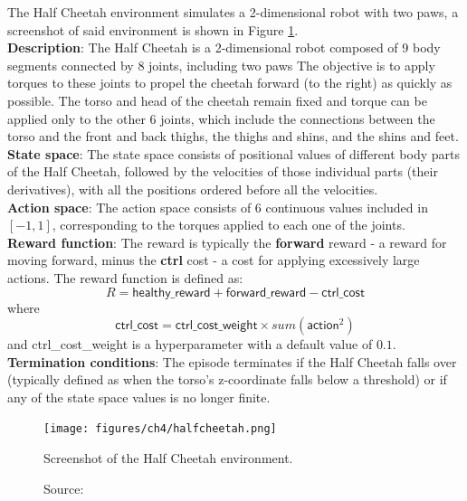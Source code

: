 The Half Cheetah environment \cite{halfcheetahfarama} 
simulates a 2-dimensional robot with two paws,
a screenshot of said environment is shown
in Figure \ref{fig:halfcheetah}.\\
\textbf{Description}: The Half Cheetah is a 2-dimensional robot
composed of 9 body segments connected by 8 joints, including two paws
The objective is to apply torques to these joints to propel the
cheetah forward (to the right) as quickly as possible.
The torso and head of the cheetah remain fixed
and torque can be applied only to the other 6 joints,
which include the connections between the torso and
the front and back thighs, the thighs and shins, and the shins and feet.\\
\textbf{State space}: The state space consists of positional values
of different body parts of the Half Cheetah, followed by the velocities
of those individual parts (their derivatives), with all the positions
ordered before all the velocities.\\
\textbf{Action space}: The action space consists of $6$ continuous values
included in $[-1, 1]$,
corresponding to the torques applied to each one of the joints.\\
\textbf{Reward function}: The reward is typically
 the \textbf{forward} reward
- a reward for moving forward, minus the \textbf{ctrl} cost
- a cost for applying excessively large actions.
The reward function is defined as:
\begin{equation}
    R = \textsf{healthy\_reward} + \textsf{forward\_reward} - \textsf{ctrl\_cost}
\end{equation}
where
\begin{equation}
    \textsf{ctrl\_cost} = \textsf{ctrl\_cost\_weight} \times sum(\textsf{action}^2)
\end{equation}
and \textsf{ctrl\_cost\_weight} is a hyperparameter with a default value of $0.1$.\\
\textbf{Termination conditions}: The episode terminates if the
Half Cheetah falls over
(typically defined as when the torso's z-coordinate falls below a threshold)
or if any of the state space values is no longer finite.

\begin{figure}[h]
    \centering
    \texttt{[image: figures/ch4/halfcheetah.png]}
    \caption{Screenshot of the Half Cheetah environment.}
    \vspace{-10px}
    \caption*{\scriptsize{Source: \cite{halfcheetahpic}}}
    \label{fig:halfcheetah}
\end{figure}

